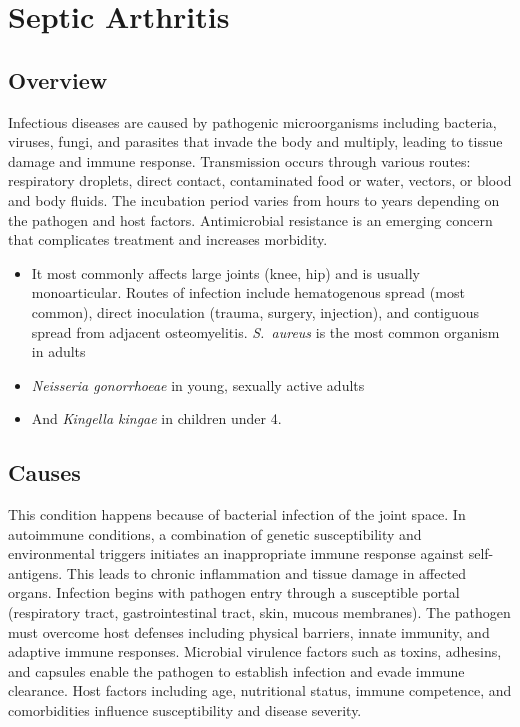 \chapter{Septic Arthritis}
\label{sec:Septic Arthritis}

\section{Overview}
Infectious diseases are caused by pathogenic microorganisms including bacteria, viruses, fungi, and parasites that invade the body and multiply, leading to tissue damage and immune response. Transmission occurs through various routes: respiratory droplets, direct contact, contaminated food or water, vectors, or blood and body fluids. The incubation period varies from hours to years depending on the pathogen and host factors. Antimicrobial resistance is an emerging concern that complicates treatment and increases morbidity.

\begin{itemize}[noitemsep]
  \item It most commonly affects large joints (knee, hip) and is usually monoarticular. Routes of infection include hematogenous spread (most common), direct inoculation (trauma, surgery, injection), and contiguous spread from adjacent osteomyelitis. \textit{S.~aureus} is the most common organism in adults
  \item \textit{Neisseria gonorrhoeae} in young, sexually active adults
  \item And \textit{Kingella kingae} in children under 4.
\end{itemize}
\section{Causes}
This condition happens because of bacterial infection of the joint space. In autoimmune conditions, a combination of genetic susceptibility and environmental triggers initiates an inappropriate immune response against self-antigens. This leads to chronic inflammation and tissue damage in affected organs. Infection begins with pathogen entry through a susceptible portal (respiratory tract, gastrointestinal tract, skin, mucous membranes). The pathogen must overcome host defenses including physical barriers, innate immunity, and adaptive immune responses. Microbial virulence factors such as toxins, adhesins, and capsules enable the pathogen to establish infection and evade immune clearance. Host factors including age, nutritional status, immune competence, and comorbidities influence susceptibility and disease severity.
